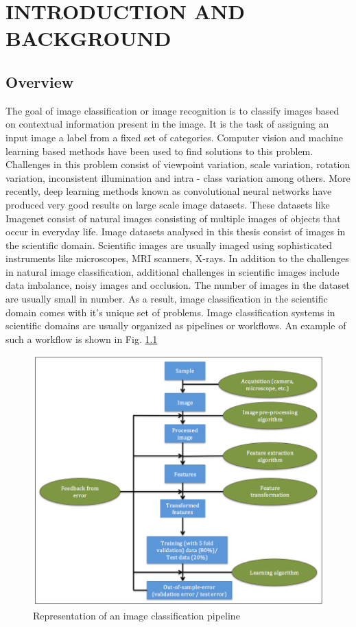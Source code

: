 \chapter{INTRODUCTION AND BACKGROUND}
\label{chap:intro}

\section{Overview}
The goal of image classification or image recognition is to classify images based on contextual information present in the image. It is the task of assigning an input image a label from a fixed set of categories. Computer vision and machine learning based methods have been used to find solutions to this problem. Challenges in this problem consist of viewpoint variation, scale variation, rotation variation, inconsistent illumination and intra - class variation among others. More recently, deep learning methods known as convolutional neural networks have produced very good results on large scale image datasets. These datasets like Imagenet \cite{deng2009imagenet} consist of natural images consisting of multiple images of objects that occur in everyday life. Image datasets analysed in this thesis consist of images in the scientific domain. Scientific images are usually imaged using sophisticated instruments like microscopes, MRI scanners, X-rays. In addition to the challenges in natural image classification, additional challenges in scientific images include data imbalance, noisy images and  occlusion. The number of images in the dataset are usually small in number. As a result, image classification in the scientific domain comes with it's unique set of problems. 
Image classification systems in scientific domains are usually organized as pipelines or workflows. An example of such a workflow is shown in Fig.  \ref{fig:flowchart1}

\begin{figure}[ht!]
    \centering
    \includegraphics[scale=0.5]{img/EP/flowchart}
    \caption{Representation of an image classification pipeline}
\label{fig:flowchart1}
\end{figure}

